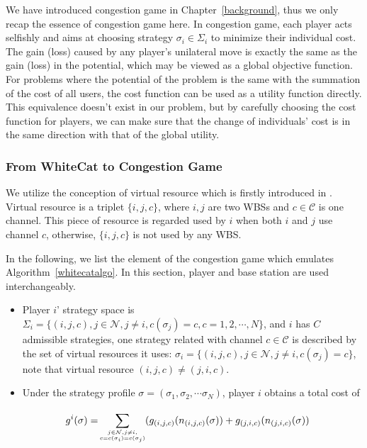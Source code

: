 \documentclass[times]{ettauth}
\theoremstyle{mytheoremstyle}
\theoremstyle{mytheoremstyle}
\theoremstyle{mytheoremstyle}
\begin{document}
%
%
We have introduced congestion game in Chapter~\ref{background}, thus we only recap the essence of congestion game here.
In congestion game, each player acts selfishly and aims at choosing strategy $\sigma_i\in \Sigma_i$ to minimize their individual cost.
The gain (loss) caused by any player's unilateral move is exactly the same as the gain (loss) in the potential, which may be viewed as a global objective function.
For problems where the potential of the problem is the same with the summation of the cost of all users, the cost function can be used as a utility function directly.
This equivalence doesn't exist in our problem, but by carefully choosing the cost function for players, we can make sure that the change of individuals' cost is in the same direction with that of the global utility.



\subsubsection{From WhiteCat to Congestion Game}
\label{gameforproblem}
We utilize the conception of virtual resource which is firstly introduced in \cite{allerton08_liu}. 
Virtual resource is a triplet $\{i, j, c\}$, where $i,j$ are two WBSs and $c\in \mathcal{C}$ is one channel.
This piece of resource is regarded used by $i$ when both $i$ and $j$ use channel $c$, otherwise, $\{i, j, c\}$ is not used by any WBS.

In the following, we list the element of the congestion game which emulates Algorithm~\ref{whitecatalgo}.
In this section, player and base station are used interchangeably.

\begin{itemize}
\item Player $i$' strategy space is $\Sigma_i=\{(i,j,c), j\in \mathcal{N}, j\ne i, c(\sigma_j)=c, c=1,2,\cdots,N\}$, and $i$ has $C$ admissible strategies, one strategy related with channel $c\in\mathcal{C}$ is described by the set of virtual resources it uses: $\sigma_i=\{(i,j,c), j\in \mathcal{N}, j\ne i, c(\sigma_j)=c\}$, note that virtual resource $(i,j,c)\neq(j,i,c)$.

\item Under the strategy profile $\sigma=(\sigma_1, \sigma_2, \cdots \sigma_N)$, player $i$ obtains a total cost of 

	\begin{equation}
\label{6}
		\begin{split}
		g^i(\sigma)=
		& \sum\limits^{}_{\tiny\substack{j\in \mathcal{N},j\neq i,\\ c=c(\sigma_i)=c(\sigma_j)}} (g_{(i,j,c)}(n_{(i,j,c)}(\sigma))+g_{(j,i,c)}(n_{(j,i,c)}(\sigma))
		\end{split}
		\end{equation}
\end{itemize}
\end{document}
